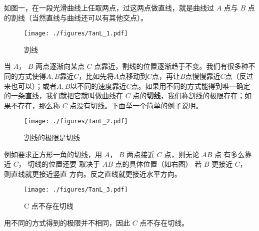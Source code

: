 
\begin{issues}
\issueTODO
\end{issues}


如图一，在一段光滑曲线上任取两点，过这两点做直线，就是曲线过 $A$ 点与 $B$ 点的割线（当然直线与曲线还可以有其他交点）。
\begin{figure}[ht]
\centering
\texttt{[image: ./figures/TanL\_1.pdf]}
\caption{割线} \label{TanL_fig1}
\end{figure}

当 $A$，  $B$ 两点逐渐向某点 $C$ 点靠近，割线的位置逐渐趋于不变。我们有很多种不同的方式使得$A, B$靠近$C$，比如先将$A$点移动到$C$点，再让$B$点慢慢靠近$C$点（反过来也可以）；或者$A, B$以不同的速度靠近$C$点。如果用不同的方式能得到唯一确定的一条直线，我们就把它就叫做曲线在 $C$ 点的\textbf{切线}，我们称割线的极限存在；如果不存在，那么称 $C$ 点没有切线。下面举一个简单的例子说明。

\begin{figure}[ht]
\vskip 0pt
\centering
\texttt{[image: ./figures/TanL\_2.pdf]}
\caption{割线的极限是切线} \label{TanL_fig2}
\end{figure}
例如要求正方形一角的切线，用
 $A$，  $B$ 两点接近 $C$ 点，则无论 $AB$ 点
有多么靠近 $C$， 切线的位置还要
取决于 $AB$ 点的具体位置（如右图）
若 $B$ 更接近 $C$， 则直线就更接近竖直
方向。反之直线就更接近水平方向。

\begin{figure}[ht]
\centering
\texttt{[image: ./figures/TanL\_3.pdf]}
\caption{C 点不存在切线} \label{TanL_fig3}
\end{figure}

用不同的方式得到的极限并不相同，因此 $C$ 点不存在切线。

